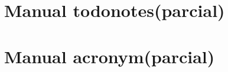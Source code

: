 
\begin{anexosenv}
\anexos
\partanexos

\chapter{Manual todonotes(parcial)}
\label{manual-todonotes}





\chapter{Manual acronym(parcial)}







\end{anexosenv}
